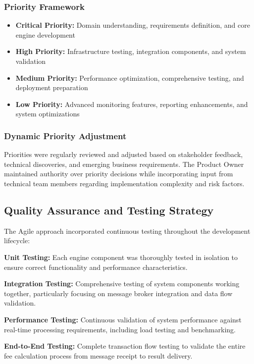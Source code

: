 \subsubsection{Priority Framework}

\begin{itemize}
    \item \textbf{Critical Priority:} Domain understanding, requirements definition, and core engine development
    \item \textbf{High Priority:} Infrastructure testing, integration components, and system validation
    \item \textbf{Medium Priority:} Performance optimization, comprehensive testing, and deployment preparation
    \item \textbf{Low Priority:} Advanced monitoring features, reporting enhancements, and system optimizations
\end{itemize}

\subsubsection{Dynamic Priority Adjustment}

Priorities were regularly reviewed and adjusted based on stakeholder feedback, technical discoveries, and emerging business requirements. The Product Owner maintained authority over priority decisions while incorporating input from technical team members regarding implementation complexity and risk factors.

\subsection{Quality Assurance and Testing Strategy}

The Agile approach incorporated continuous testing throughout the development lifecycle:

\textbf{Unit Testing:} Each engine component was thoroughly tested in isolation to ensure correct functionality and performance characteristics.

\textbf{Integration Testing:} Comprehensive testing of system components working together, particularly focusing on message broker integration and data flow validation.

\textbf{Performance Testing:} Continuous validation of system performance against real-time processing requirements, including load testing and benchmarking.

\textbf{End-to-End Testing:} Complete transaction flow testing to validate the entire fee calculation process from message receipt to result delivery.

